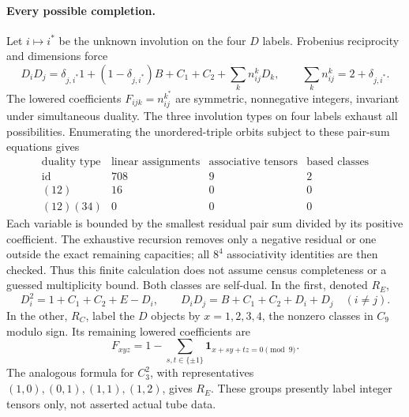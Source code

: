 \paragraph{Every possible completion.}
Let $i\mapsto i^*$ be the unknown involution on the four $D$ labels.
Frobenius reciprocity and dimensions force
\[
 D_iD_j=\delta_{j,i^*}1+(1-\delta_{j,i^*})B+C_1+C_2+
             \sum_k n_{ij}^kD_k,\qquad
 \sum_k n_{ij}^k=2+\delta_{j,i^*}.
\]
The lowered coefficients $F_{ijk}=n_{ij}^{k^*}$ are symmetric,
nonnegative integers, invariant under simultaneous duality. The three
involution types on four labels exhaust all possibilities. Enumerating
the unordered-triple orbits subject to these pair-sum equations gives
\[
\begin{array}{c|rrr}
\text{duality type}&\text{linear assignments}&\text{associative tensors}&
 \text{based classes}\\\hline
\mathrm{id}&708&9&2\\
(12)&16&0&0\\
(12)(34)&0&0&0
\end{array}
\]
Each variable is bounded by the smallest residual pair sum divided by its
positive coefficient. The exhaustive recursion removes only a negative
residual or one outside the exact remaining capacities; all $8^4$
associativity identities are then checked. Thus this finite calculation
does not assume census completeness or a guessed multiplicity bound.
Both classes are self-dual. In the first, denoted $R_E$,
\[
 D_i^2=1+C_1+C_2+E-D_i,\qquad
 D_iD_j=B+C_1+C_2+D_i+D_j\quad(i\ne j).
\]
In the other, $R_C$, label the $D$ objects by $x=1,2,3,4$, the nonzero
classes in $C_9$ modulo sign. Its remaining lowered coefficients are
\[
 F_{xyz}=1-\sum_{s,t\in\{\pm1\}}
                 \mathbf1_{x+sy+tz=0\pmod9}.
\]
The analogous formula for $C_3^2$, with representatives
$(1,0),(0,1),(1,1),(1,2)$, gives $R_E$. These groups presently label
integer tensors only, not asserted actual tube data.

